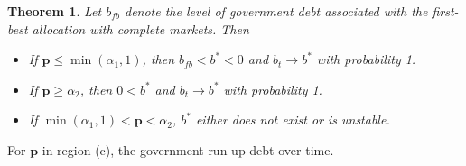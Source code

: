\documentclass[12pt]{article}
\newcommand{\tjs}[1]{\textcolor{red}{$^{\textrm{tjs}}${#1}}}
\newtheorem{theorem}{Theorem}[section]
\begin{document}

 	\begin{theorem}\label{thm:convergence}
Let %
$b_{fb}$ denote the level of  government  debt associated with the first-best allocation with complete markets.
Then %
		\begin{itemize}
			\item[a.]  If $\bm{p}\leq\min(\alpha_1,1)$, then  $b_{fb}<b^*<0$ and $b_t\rightarrow b^*$ with probability 1.
			\item[b.] If $\bm{p} \geq \alpha_2$, then   $0<b^*$ and $b_t \rightarrow b^*$ with probability 1.
            \item[c.] If $ \min(\alpha_1,1)<\bm{p}<\alpha_2 $,   $b^*$ either does not exist or is unstable.
									\end{itemize}			\end{theorem}
  For $\bm{p}$ in region (c),
the government  run up debt over time.
\end{document}
